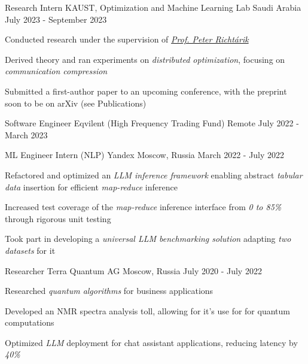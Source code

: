 
\begin{cventries}
  \cventry
    {Research Intern}
    {KAUST, Optimization and Machine Learning Lab}
    {Saudi Arabia}
    {July 2023 - September 2023}
    {
      \begin{cvitems}
        \item {Conducted research under the supervision of  \href{https://richtarik.org/}{\textit{Prof. Peter Richtárik}}}
        \item {Derived theory and ran experiments on \textit{distributed optimization}, focusing on \textit{communication compression}}
        \item {Submitted a first-author paper to an upcoming conference, with the preprint soon to be on arXiv (see Publications)}
      \end{cvitems}
    }

  \cventry
    {Software Engineer}
    {Eqvilent (High Frequency Trading Fund)}
    {Remote}
    {July 2022 - March 2023}
    {}

  \cventry
    {ML Engineer Intern (NLP)}
    {Yandex}
    {Moscow, Russia}
    {March 2022 - July 2022}
    {
      \begin{cvitems} %
        \item {Refactored and optimized an \textit{LLM inference framework} enabling abstract \textit{tabular data} insertion for efficient \textit{map-reduce} inference}
        \item {Increased test coverage of the \textit{map-reduce} inference interface from \textit{0 to 85\%} through rigorous unit testing}
        \item {Took part in developing a \textit{universal LLM benchmarking solution} adapting \textit{two datasets} for it}
      \end{cvitems}
    }
    
  \cventry
    {Researcher} %
    {Terra Quantum AG} %
    {Moscow, Russia} %
    {July 2020 - July 2022} %
    {
      \begin{cvitems} %
        \item { Researched \textit{quantum algorithms} for business applications }
        \item { Developed an {NMR spectra} analysis toll, allowing for it's use for  for quantum computations }
        \item { Optimized \textit{LLM} deployment for chat assistant applications, reducing latency by \textit{40\%} }
      \end{cvitems}
    }
    
\end{cventries}
